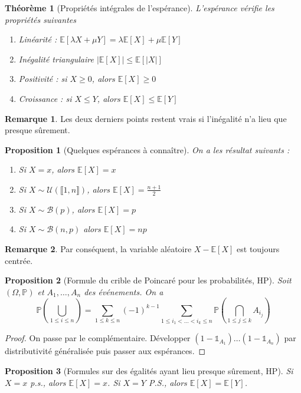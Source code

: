 \documentclass[french]{book}
\renewcommand{\P}{\mathbb{P}}
\newcommand{\E}{\mathbb{E}}
\theoremstyle{plain}
\newtheorem{thm}{Théorème}[chapter]
\newtheorem{prop}{Proposition}[chapter]
\theoremstyle{definition}
\newtheorem{rmq}{Remarque}[chapter]
\theoremstyle{remark}
\begin{document}
\begin{thm}[Propriétés intégrales de l'espérance]
	L'espérance vérifie les propriétés suivantes
	\begin{enumerate}
		\item Linéarité : $\E\left[\lambda X+\mu Y\right]=\lambda\E[X]+\mu\E[Y]$
		\item Inégalité triangulaire $\left\lvert\E[X]\right\rvert\leqslant\E\left[\lvert X\rvert\right]$
		\item Positivité : si $X\geqslant 0$, alors $\E[X]\geqslant 0$
		\item Croissance : si $X\leqslant Y$, alors $\E[X]\leqslant\E[Y]$
	\end{enumerate}
\end{thm}
\begin{rmq} Les deux derniers points restent vrais si l'inégalité n'a lieu que presque sûrement. \end{rmq}
\begin{prop}[Quelques espérances à connaître]
	On a les résultat suivants :
	\begin{enumerate}
		\item Si $X=x$, alors $\E[X]=x$
		\item Si $X\sim \mathcal{U}(\llbracket1,n\rrbracket)$, alors $\E[X]=\displaystyle\frac{n+1}{2}$
		\item Si $X\sim\mathcal{B}(p)$, alors $\E[X]=p$
		\item Si $X\sim\mathcal{B}(n,p)$ alors $\E[X]=np$
	\end{enumerate}
\end{prop}
\begin{rmq} Par conséquent, la variable aléatoire $X-\E[X]$ est toujours centrée. \end{rmq}
\begin{prop}[Formule du crible de Poincaré pour les probabilités, HP]
	Soit $(\Omega,\P)$ et $A_1,\ldots,A_n$ des événements. On a $$\P\left(\bigcup_{1\leqslant i\leqslant n}\right)=\sum_{1\leqslant k \leqslant n}(-1)^{k-1}\sum_{1\leqslant i_1<\ldots<i_k\leqslant n}\P\left(\bigcap_{1\leqslant j\leqslant k}A_{i_j}\right)$$
\end{prop}
\begin{proof}
	On passe par le complémentaire. Développer $(1-\mathds{1}_{A_1})\ldots(1-\mathds{1}_{A_n})$ par distributivité généralisée puis passer aux espérances.
\end{proof}
\begin{prop}[Formules sur des égalités ayant lieu presque sûrement, HP]
	Si $X=x$ p.s., alors $\E[X]=x$. Si $X=Y$ P.S., alors $\E[X]=\E[Y]$.
\end{prop}
\end{document}
